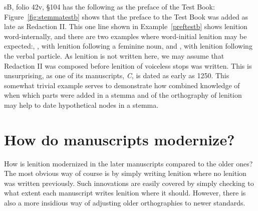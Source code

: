 \gls{sB}, folio 42v, \S 104 has the following as the preface of the Test Book:
Figure~\ref{fig:stemmatestb} shows that the preface to the Test Book was added as late as Redaction II.
This one line shown in Example~\ref{preftestb} shows lenition word-internally, and there are two examples  where word-initial lenition may be expected:, , with lenition following a feminine noun, and , with lenition following the verbal particle.
As lenition  is not written here, we may assume that Redaction II was composed before lenition of voiceless stops was written.
This is unsurprising, as one of its manuscripts, \textit{C}, is dated as early as 1250.
This somewhat trivial example serves to demonstrate how combined knowledge of when which parts were added in a stemma and of the orthography of lenition may help to date hypothetical nodes in a stemma. 


\section{How do manuscripts modernize?}
\label{sec:how-do-manuscripts}

How is lenition modernized in the later manuscripts compared to the older ones?
The most obvious way of course is by simply writing lenition where no lenition was written previously. Such innovations are easily covered by simply checking to what extent each manuscript writes lenition where it should. However, there is also a more insidious way of adjusting older orthographies to newer standards.

